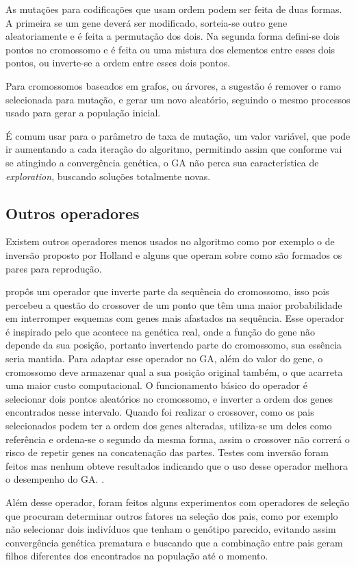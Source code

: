 As mutações para codificações que usam ordem podem ser feita de duas formas. A primeira se um gene deverá ser modificado, sorteia-se outro gene aleatoriamente e é feita a permutação dos dois. Na segunda forma defini-se dois pontos no cromossomo e é feita ou uma mistura dos elementos entre esses dois pontos, ou inverte-se a ordem entre esses dois pontos.

Para cromossomos baseados em grafos, ou árvores, a sugestão é remover o ramo selecionada para mutação, e gerar um novo aleatório, seguindo o mesmo processos usado para gerar a população inicial.

É comum usar para o parâmetro de taxa de mutação, um valor variável, que pode ir aumentando a cada iteração do algoritmo, permitindo assim que conforme vai se atingindo a convergência genética, o GA não perca sua característica de \textit{exploration}, buscando soluções totalmente novas.

\subsection{Outros operadores}
Existem outros operadores menos usados no algoritmo como por exemplo o de inversão proposto por Holland e alguns que operam sobre como são formados os pares para reprodução.

\citeauthor{Holland1992} propôs um operador que inverte parte da sequência do cromossomo, isso pois percebeu a questão do crossover de um ponto que têm uma maior probabilidade em interromper esquemas com genes mais afastados na sequência. Esse operador é inspirado pelo que acontece na genética real, onde a função do gene não depende da sua posição, portanto invertendo parte do cromossomo, sua essência seria mantida. Para adaptar esse operador no GA, além do valor do gene, o cromossomo deve armazenar qual a sua posição original também, o que acarreta uma maior custo computacional. O funcionamento básico do operador é selecionar dois pontos aleatórios no cromossomo, e inverter a ordem dos genes encontrados nesse intervalo. Quando foi realizar o crossover, como os pais selecionados podem ter a ordem dos genes alteradas, utiliza-se um deles como referência e ordena-se o segundo da mesma forma, assim o crossover não correrá o risco de repetir genes na concatenação das partes. Testes com inversão foram feitos mas nenhum obteve resultados indicando que o uso desse operador melhora o desempenho do GA. \cite{Mitchell1996}.

Além desse operador, foram feitos alguns experimentos com operadores de seleção que procuram determinar outros fatores na seleção dos pais, como por exemplo não selecionar dois indivíduos que tenham o genótipo parecido, evitando assim convergência genética prematura e buscando que a combinação entre pais geram filhos diferentes dos encontrados na população até o momento.

